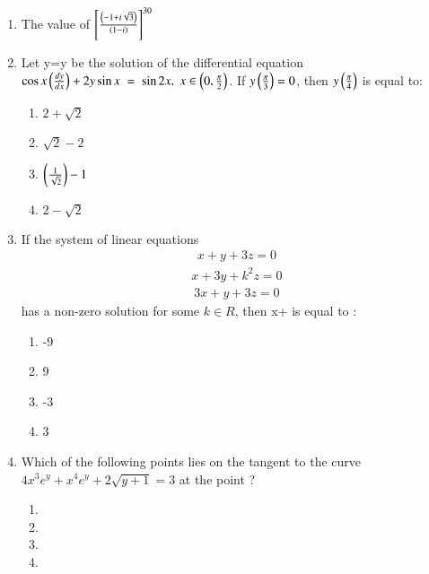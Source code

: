\documentclass[journal,,12pt,onecolumn]{IEEEtran}
\theoremstyle{remark}
\begin{document}
\begin{enumerate}
\begin{enumerate}
        \end{enumerate}
        \item The value of $\left[\frac{\left(-1+i\sqrt{3}\right)}{\left(1-i\right)}\right]^{30}$
        \begin{enumerate}
        \end{enumerate}
\item Let y=y be the solution of the differential equation $\cos{x}\left(\frac{dy}{dx}\right)+2y \sin{x}\;=\;\sin{2x},\;x\in\left(0,\frac{\pi}{2}\right)$. If $y\left(\frac{\pi}{3}\right)=0$, then $y\left(\frac{\pi}{4}\right)$ is equal to:
        \begin{enumerate}
        \item $2+\sqrt{2}$
        \item $\sqrt{2}-2$
        \item $\left(\frac{1}{\sqrt{2}}\right)-1$
        \item $2-\sqrt{2}$
        \end{enumerate}
    \item If the system of linear equations 
    \begin{align*}
        x+y+3z=0
    \end{align*}
    \begin{align*}
        x+3y+k^2z=0
    \end{align*}
    \begin{align*}
        3x+y+3z=0
    \end{align*}
    has a non-zero solution  for some $k\in R$, then x+ is equal to :
    \begin{enumerate}
    
        \item -9
        \item 9
        \item -3
        \item 3
       \end{enumerate}

 
 \item Which of the following points lies on the tangent to the curve $4x^3e^y+x^4e^y+2\sqrt{y+1}=3$ at the point  ?
 \begin{enumerate}
     \item {}
     \item {}
     \item {}
     \item {}
 \end{enumerate}
 \end{enumerate}
\end{document}
